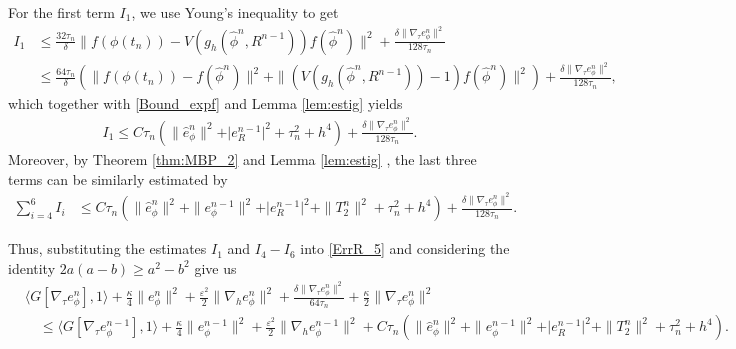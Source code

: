 \documentclass{m2an}
\begin{document}
For the first term $ I_{1} $, we use Young's inequality to get
\begin{equation*}
	\begin{aligned}
		I_1 & \leq \frac{ 32 \tau_{n} }{ \delta } \| f( \phi( t_{n} ) ) - V( g_h(\hat{\phi}^{n}, R^{n-1}) )   f(\hat{\phi}^{n}) \|^2 + \frac{ \delta \| \nabla_{\tau} e_\phi^{n} \|^2 }{128 \tau_{n} } \\
		& \leq \frac{ 64 \tau_{n} }{ \delta } \left( \| f( \phi( t_{n} ) ) -    f(\hat{\phi}^{n}) \|^2 + \| ( V( g_h(\hat{\phi}^{n}, R^{n-1}) ) - 1 )   f(\hat{\phi}^{n}) \|^2 \right) + \frac{ \delta \| \nabla_{\tau} e_\phi^{n} \|^2 }{128 \tau_{n} },
	\end{aligned}
\end{equation*}
which together with \eqref{Bound_expf} and Lemma \ref{lem:estig}  yields
\begin{equation*}\label{ErrR_6}
	\begin{aligned}
		I_1 \leq C \tau_{n} \left( \| \hat{e}_\phi^{n} \|^2 + \vert e_R^{n-1} \vert^2 + \tau_{n}^2 + h^4 \right) + \frac{ \delta \| \nabla_{\tau} e_\phi^{n} \|^2 }{128 \tau_{n} }.
	\end{aligned}
\end{equation*}
Moreover, by Theorem \ref{thm:MBP_2} and Lemma \ref{lem:estig} , the last three terms can be similarly estimated by
\begin{equation*}\label{ErrR_7}
	\begin{aligned}
		\sum^{6}_{i=4} I_{i} & 
		\leq  C \tau_{n} \left( \| \hat{e}_{\phi}^{n}  \|^2 + \| e_{\phi}^{n-1} \|^2 + \vert e_R^{n-1} \vert^2 + \| T_2^n \|^2 + \tau_{n}^2 + h^4 \right) + \frac{ \delta \| \nabla_{\tau} e_\phi^{n} \|^2 }{128 \tau_{n} }.
	\end{aligned}
\end{equation*}

Thus, substituting the estimates $I_1$ and $I_4-I_6$ into \eqref{ErrR_5} and considering the identity $ 2 a(a-b) \geq a^2 - b^2 $ give us
\begin{equation}\label{ErrR_8}
	\begin{aligned}
		& \big\langle G[ \nabla_{\tau} e_\phi^{n} ], 1 \big\rangle + \frac{\kappa}{4} \| e_{\phi}^{n} \|^2 + \frac{\varepsilon^2 }{2} \| \nabla_{h} e_\phi^{n} \|^2 + \frac{ \delta \| \nabla_{\tau} e_\phi^{n} \|^2 }{64 \tau_{n} } + \frac{\kappa}{2} \| \nabla_{\tau} e_\phi^{n} \|^2  
		\\
		& \quad \leq \big\langle G[ \nabla_{\tau} e_\phi^{n-1} ], 1 \big\rangle  + \frac{\kappa}{4} \| e_{\phi}^{n-1} \|^2 
		+ \frac{\varepsilon^2 }{2} \| \nabla_{h} e_\phi^{n-1} \|^2 
		 + C \tau_{n} \left( \| \hat{e}_{\phi}^{n}  \|^2 + \| e_{\phi}^{n-1} \|^2 + \vert e_R^{n-1} \vert^2  + \| T_2^n \|^2 + \tau_{n}^2 + h^4 \right).
	\end{aligned}
\end{equation}
\end{document}
